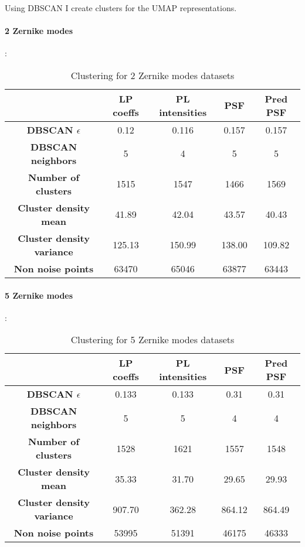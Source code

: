 		Using DBSCAN I create clusters for the UMAP representations.
		
		\paragraph{2 Zernike modes}:
		\begin{table}[h!]
			\centering
			\begin{tabular}{|c|c|c|c|c|}
				\hline
				\textbf{} & \textbf{LP coeffs} & \textbf{PL intensities} & \textbf{PSF} & \textbf{Pred PSF}\\
				\hline
				\textbf{DBSCAN $\epsilon$} & 0.12 & 0.116 & 0.157 & 0.157\\
				\hline
				\textbf{DBSCAN neighbors} & 5 & 4 & 5 & 5\\
				\hline
				\textbf{Number of clusters} & 1515 & 1547 & 1466 & 1569\\
				\hline
				\textbf{Cluster density mean} & 41.89 & 42.04 & 43.57 & 40.43\\
				\hline
				\textbf{Cluster density variance} & 125.13 & 150.99 & 138.00 & 109.82\\
				\hline
				\textbf{Non noise points} & 63470 & 65046 & 63877 & 63443\\
				\hline
			\end{tabular}
		\caption{Clustering for 2 Zernike modes datasets}
		\end{table}
		\FloatBarrier
		
		\paragraph{5 Zernike modes}:
		\begin{table}[h!]
			\centering
			\begin{tabular}{|c|c|c|c|c|}
				\hline
				\textbf{} & \textbf{LP coeffs} & \textbf{PL intensities} & \textbf{PSF} & \textbf{Pred PSF}\\
				\hline
				\textbf{DBSCAN $\epsilon$} & 0.133 & 0.133 & 0.31 & 0.31\\
				\hline
				\textbf{DBSCAN neighbors} & 5 & 5 & 4 & 4\\
				\hline
				\textbf{Number of clusters} & 1528 & 1621 & 1557 & 1548\\
				\hline
				\textbf{Cluster density mean} & 35.33 & 31.70 & 29.65 & 29.93\\
				\hline
				\textbf{Cluster density variance} & 907.70 & 362.28 & 864.12 & 864.49\\
				\hline
				\textbf{Non noise points} & 53995 & 51391 & 46175 & 46333\\
				\hline
			\end{tabular}
		\caption{Clustering for 5 Zernike modes datasets}
		\end{table}
		\FloatBarrier
		

